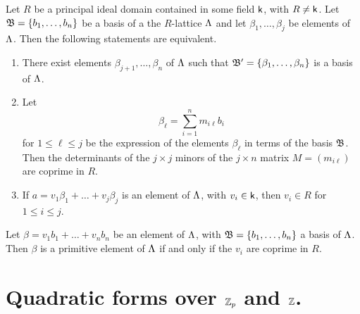 \begin{theoremx}\label{thm:quadratic-form-lattice-equiv-conditions}
    Let \(R\) be a principal ideal domain contained in some field \(\mathsf{k}\), with \(R \neq \mathsf{k}\). Let \(\mathfrak{B} = \{b_1, \dots, b_n\}\) be a basis of a the \(R\)-lattice \(\Lambda\) and let \(\beta_1, \dots, \beta_j\) be elements of \(\Lambda\). Then the following statements are equivalent.

    \medskip

    \begin{enumerate}[nosep, label=(\alph*)]
        \item There exist elements \(\beta_{j+1}, \dots, \beta_n\) of \(\Lambda\) such that \(\mathfrak{B}' = \{\beta_1, \dots, \beta_n\}\) is a basis of \(\Lambda\).
        \item Let \[\beta_{\ell} = \sum_{i=1}^n m_{i\ell} b_i\] for \(1 \leq \ell \leq j\) be the expression of the elements \(\beta_{\ell}\) in terms of the basis \(\mathfrak{B}\). Then the determinants of the \(j \times j\) minors of the \(j \times n\) matrix \(M = (m_{i\ell})\) are coprime in \(R\).
        \item If \(a = v_1\beta_1 + \dots + v_j\beta_j\) is an element of \(\Lambda\), with \(v_i \in \mathsf{k}\), then \(v_i \in R\) for \(1 \leq i \leq j\).
    \end{enumerate}
\end{theoremx}

\begin{corollary}
    Let \(\beta = v_1b_1 + \dots + v_nb_n\) be an element of \(\Lambda\), with \(\mathfrak{B} = \{b_1, \dots, b_n\}\) a basis of \(\Lambda\). Then \(\beta\) is a primitive element of \(\Lambda\) if and only if the \(v_i\) are coprime in \(R\).
\end{corollary}

\section{Quadratic forms over \(\mathbb{Z}_p\) and \(\mathbb{Z}\).}
